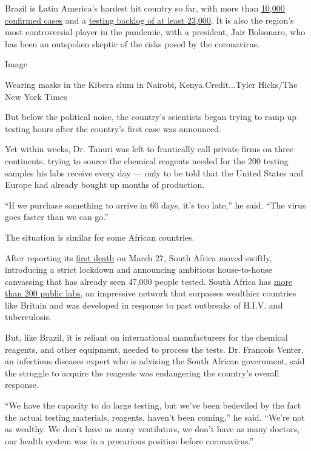 Brazil is Latin America's hardest hit country so far, with more than
\href{https://www.ecdc.europa.eu/en/publications-data/download-todays-data-geographic-distribution-covid-19-cases-worldwide}{10,000
confirmed cases} and a
\href{https://brazilian.report/coronavirus-brazil-live-blog/2020/04/02/over-23000-still-brazilians-await-covid-19-test-results/}{testing
backlog of at least 23,000}. It is also the region's most controversial
player in the pandemic, with a president, Jair Bolsonaro, who has been
an outspoken skeptic of the risks posed by the coronavirus.

Image

Wearing masks in the Kibera slum in Nairobi, Kenya.Credit...Tyler
Hicks/The New York Times

But below the political noise, the country's scientists began trying to
ramp up testing hours after the country's first case was announced.

Yet within weeks, Dr. Tanuri was left to frantically call private firms
on three continents, trying to source the chemical reagents needed for
the 200 testing samples his labs receive every day --- only to be told
that the United States and Europe had already bought up months of
production.

``If we purchase something to arrive in 60 days, it's too late,'' he
said. ``The virus goes faster than we can go.''

The situation is similar for some African countries.

After reporting its
\href{https://www.nytimes3xbfgragh.onion/2020/03/27/world/africa/south-africa-coronavirus.html}{first
death} on March 27, South Africa moved swiftly, introducing a strict
lockdown and announcing ambitious house-to-house canvassing that has
already seen 47,000 people tested. South Africa has
\href{https://nationalgovernment.co.za/units/view/251/national-health-laboratory-service-nhls}{more
than 200 public labs}, an impressive network that surpasses wealthier
countries like Britain and was developed in response to past outbreaks
of H.I.V. and tuberculosis.

But, like Brazil, it is reliant on international manufacturers for the
chemical reagents, and other equipment, needed to process the tests. Dr.
Francois Venter, an infectious diseases expert who is advising the South
African government, said the struggle to acquire the reagents was
endangering the country's overall response.

``We have the capacity to do large testing, but we've been bedeviled by
the fact the actual testing materials, reagents, haven't been coming,''
he said. ``We're not as wealthy. We don't have as many ventilators, we
don't have as many doctors, our health system was in a precarious
position before coronavirus.''

